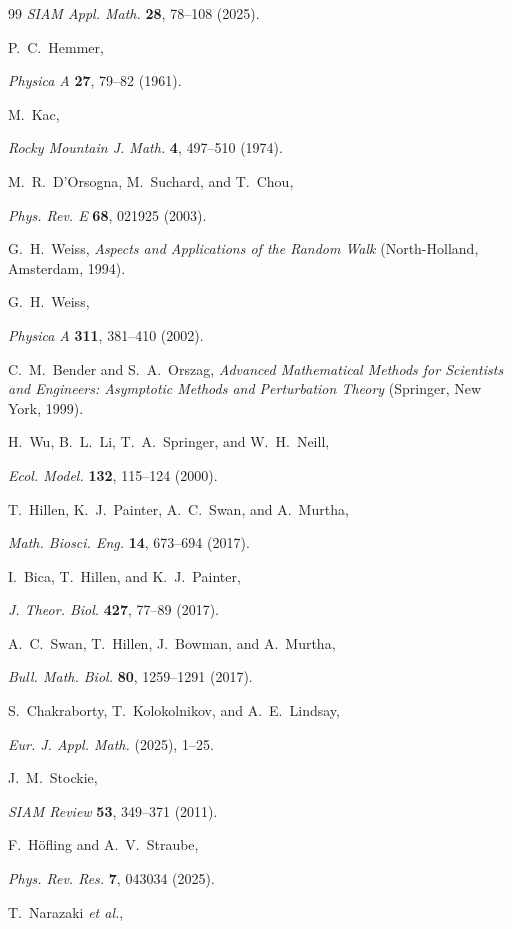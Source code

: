 \documentclass[
 reprint,










 amsmath,amssymb,
 aps, prl,






longbibliography
]{revtex4-2}
\begin{document}
\begin{thebibliography}{99}
\emph{SIAM Appl. Math.} \textbf{28}, 78--108 (2025).

P.~C.~Hemmer,

\emph{Physica A} \textbf{27}, 79--82 (1961).

M.~Kac,

\emph{Rocky Mountain J. Math.} \textbf{4}, 497--510 (1974).

M.~R.~D'Orsogna, M.~Suchard, and T.~Chou,

\emph{Phys. Rev. E} \textbf{68}, 021925 (2003).

G.~H.~Weiss, \emph{Aspects and Applications of the Random Walk} (North-Holland, Amsterdam, 1994).

G.~H.~Weiss,

 \emph{Physica A} \textbf{311}, 381--410 (2002).

C.~M.~Bender and S.~A.~Orszag, \emph{Advanced Mathematical Methods for Scientists and Engineers: Asymptotic Methods and Perturbation Theory} (Springer, New York, 1999).

H.~Wu, B.~L.~Li, T.~A.~Springer, and W.~H.~Neill,

\emph{Ecol. Model.} \textbf{132}, 115--124 (2000).

T.~Hillen, K.~J.~Painter, A.~C.~Swan, and A.~Murtha,

\emph{Math. Biosci. Eng.} \textbf{14}, 673--694 (2017).

I.~Bica, T.~Hillen, and K.~J.~Painter,

\emph{J. Theor. Biol.} \textbf{427}, 77--89 (2017).

A.~C.~Swan, T.~Hillen, J.~Bowman, and A.~Murtha,

\emph{Bull. Math. Biol.}  \textbf{80}, 1259--1291 (2017).

S.~Chakraborty, T.~Kolokolnikov, and A.~E.~Lindsay,

 \emph{Eur. J. Appl. Math.} (2025), 1–25.

J.~M.~Stockie,

\emph{SIAM Review} \textbf{53}, 349--371 (2011).

F.~H\"ofling and A.~V.~Straube,

\emph{Phys. Rev. Res.} \textbf{7}, 043034 (2025).

T.~Narazaki \emph{et al.},


\end{thebibliography}
\end{document}
